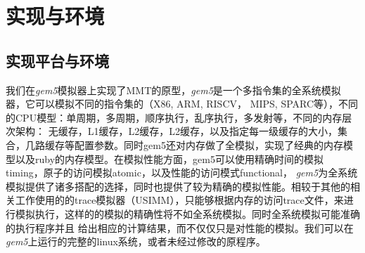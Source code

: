 \chapter{实现与环境}

\section{实现平台与环境}
我们在\emph{gem5}模拟器上实现了MMT的原型，\emph{gem5}是一个多指令集的全系统模拟器，它可以模拟不同的指令集的（X86, ARM, RISCV， MIPS, SPARC等），不同的CPU模型：单周期，多周期，顺序执行，乱序执行，多发射等，不同的内存层次架构：
无缓存，L1缓存，L2缓存，L2缓存，以及指定每一级缓存的大小，集合，几路缓存等配置参数。同时gem5还对内存做了全模拟，实现了经典的内存模型以及ruby的内存模型。在模拟性能方面，gem5可以使用精确时间的模拟timing，原子的访问模拟atomic，以及性能的访问模式functional，
\emph{gem5}为全系统模拟提供了诸多搭配的选择，同时也提供了较为精确的模拟性能。相较于其他的相关工作使用的的trace模拟器（USIMM），只能够根据内存的访问trace文件，来进行模拟执行，这样的的模拟的精确性将不如全系统模拟。同时全系统模拟可能准确的执行程序并且
给出相应的计算结果，而不仅仅只是对性能的模拟。我们可以在\emph{gem5}上运行的完整的linux系统，或者未经过修改的原程序。
